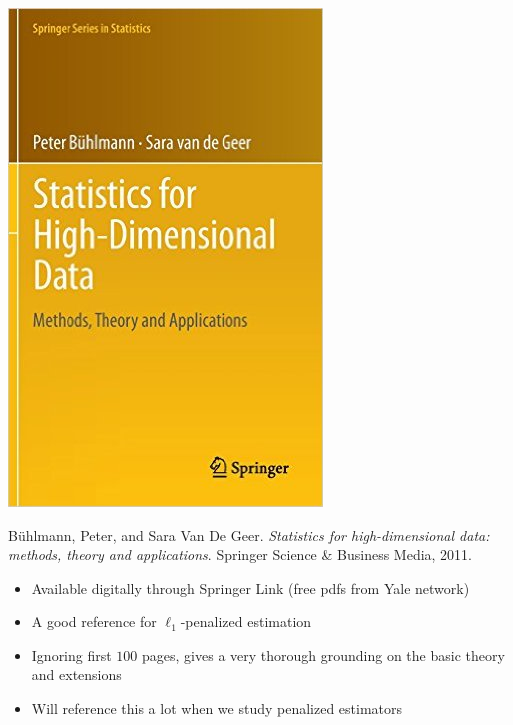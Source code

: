 \begin{frame}[fragile] \frametitle{}

\noindent
\begin{minipage}{0.5\textwidth}
\includegraphics[width=0.9\linewidth]{img/buhlmann.jpg}
\end{minipage}%
\begin{minipage}{0.5\textwidth}
Bühlmann, Peter, and Sara Van De Geer. {\it Statistics for high-dimensional data: methods, theory and applications}. Springer Science \& Business Media, 2011. \\
\begin{itemize}
\item Available digitally through Springer Link (free pdfs from Yale network)
\item A good reference for $\ell_1$-penalized estimation
\item Ignoring first $100$ pages, gives a very thorough grounding on the basic theory and extensions
\item Will reference this a lot when we study penalized estimators
\end{itemize}
\end{minipage}
\end{frame}



